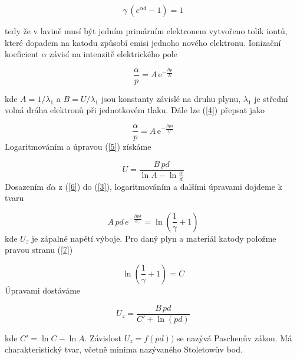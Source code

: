 \documentclass[a4paper,12pt]{article}
\newcommand{\e}{\text{e}}
\begin{document}
\begin{equation}
	\gamma\,(e^{\alpha d } - 1) = 1
	\label{3}
\end{equation} 

tedy že v lavině musí být jedním primárním elektronem vytvořeno tolik iontů, které dopadem na katodu způsobí emisi jednoho nového elektronu. Ionizační koeficient $\alpha$ závisí na intenzitě elektrického pole 

\begin{equation}
	\frac{\alpha}{p} = A\,\e^{-\frac{Bp}{E}} 
	\label{4}
\end{equation}

kde $A = 1/\lambda_1$ a $B = U/\lambda_1$ jsou konstanty závislé na druhu plynu, $\lambda_1$ je střední volná dráha elektronů při jednotkovém tlaku. Dále lze (\ref{4}) přepsat jako

\begin{equation}
	\frac{\alpha}{p} = A\,\e^{-\frac{Bpd}{U}} 
	\label{5}
\end{equation}
Logaritmováním a úpravou (\ref{5}) získáme

\begin{equation}
	U = \frac{B\,pd}{\ln A - \ln \frac{\alpha}{d}}
	\label{6}
\end{equation}
Dosazením $d\alpha$ z (\ref{6}) do (\ref{3}), logaritmováním a dalšími úpravami dojdeme k tvaru

\begin{equation}
	A\,pd\,e^{-\frac{Bpd}{U_z}} = \ln \left(\frac{1}{\gamma} + 1\right)
	\label{7}
\end{equation}
kde $U_z$ je zápalné napětí výboje. Pro daný plyn a materiál katody položme pravou stranu (\ref{7})

\begin{equation}
	\ln \left(\frac{1}{\gamma} + 1\right) = C
	\label{8}
\end{equation}
Úpravami dostáváme

\begin{equation}
	U_z = \frac{B\,pd}{C' + \ln(pd)}
	\label{9}
\end{equation}

kde $C' = \ln C - \ln A$. Závislost $U_z = f (pd))$ se nazývá Paschenův zákon. Má charakteristický tvar, včetně minima nazývaného Stoletowův bod.
\end{document}
